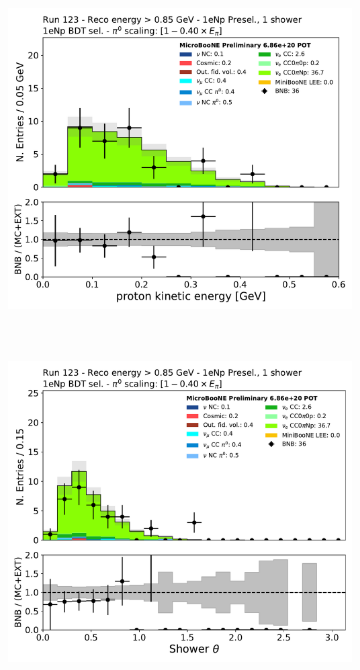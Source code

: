 \begin{figure}[H]
\begin{center}
\begin{subfigure}{0.4\textwidth}
    \includegraphics[width=1.00\textwidth]{Sidebands/Figures/1eNp/HighEnergy/HiEext_NPOneShr_NPBDT_pi0e040/protonenergy.pdf}
    \end{subfigure}\\
    \begin{subfigure}{0.4\textwidth}
    \includegraphics[width=1.00\textwidth]{Sidebands/Figures/1eNp/HighEnergy/HiEext_NPOneShr_NPBDT_pi0e040/shr_theta.pdf}
    \end{subfigure}

\end{center}
\end{figure}
